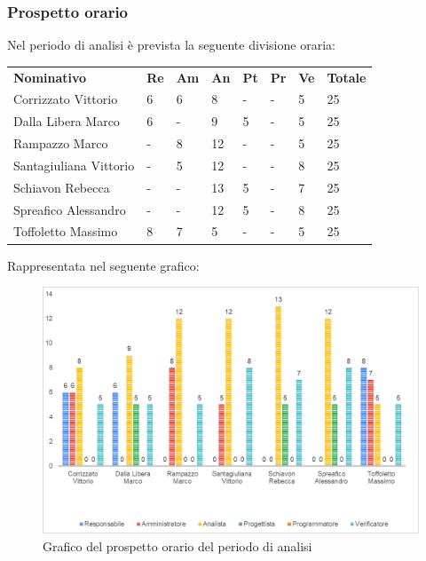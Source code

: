 		\subsubsection{Prospetto orario}
		Nel periodo di analisi è prevista la seguente divisione oraria:
		\begin{longtable} {				
				>{}p{40mm}  
				>{}p{8mm}
				>{}p{8mm}
				>{}p{8mm}
				>{}p{8mm}
				>{}p{8mm}
				>{}p{8mm}
				>{}p{12mm}				
			}			
			\rowcolor{gray!50}
			\textbf{Nominativo} & \textbf{Re} & \textbf{Am} & \textbf{An} & \textbf{Pt} & \textbf{Pr} & \textbf{Ve} & \textbf{Totale}	\TBstrut \\ [2mm]
			Corrizzato Vittorio & 6 & 6 & 8 & - & - & 5 & 25 \TBstrut \\ [2mm]
			Dalla Libera Marco & 6 & - & 9 & 5 & - & 5 & 25 \TBstrut \\ [2mm]
			Rampazzo Marco & - & 8 & 12 & - & - & 5 & 25 \TBstrut \\ [2mm]
			Santagiuliana Vittorio & - & 5 & 12 & - & - & 8 & 25 \TBstrut \\ [2mm]
			Schiavon Rebecca & - & - & 13 & 5 & - & 7 & 25 \TBstrut \\ [2mm]
			Spreafico Alessandro & - & - & 12 & 5 & - & 8 & 25 \TBstrut \\ [2mm]
			Toffoletto Massimo & 8 & 7 & 5 & - & - & 5 & 25 \TBstrut \\ [2mm]
		\end{longtable}
		Rappresentata nel seguente grafico: \\
		\begin{figure} [h!]
			\includegraphics[width=\linewidth]{./img/Grafici/1.png}
			\caption{Grafico del prospetto orario del periodo di analisi}
		\end{figure}
	
